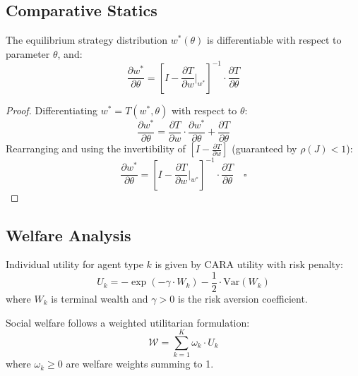 \subsection{Comparative Statics}

\begin{proposition}
\label{prop:comparative}
The equilibrium strategy distribution $w^*(\theta)$ is differentiable with respect to parameter $\theta$, and:
\begin{equation}
\frac{\partial w^*}{\partial \theta} = \left[I - \frac{\partial T}{\partial w}\bigg|_{w^*}\right]^{-1} \cdot \frac{\partial T}{\partial \theta}
\end{equation}
\end{proposition}

\begin{proof}
Differentiating $w^* = T(w^*, \theta)$ with respect to $\theta$:
\begin{equation}
\frac{\partial w^*}{\partial \theta} = \frac{\partial T}{\partial w} \cdot \frac{\partial w^*}{\partial \theta} + \frac{\partial T}{\partial \theta}
\end{equation}
Rearranging and using the invertibility of $[I - \frac{\partial T}{\partial w}]$ (guaranteed by $\rho(J) < 1$):
\begin{equation}
\frac{\partial w^*}{\partial \theta} = \left[I - \frac{\partial T}{\partial w}\bigg|_{w^*}\right]^{-1} \cdot \frac{\partial T}{\partial \theta} \quad \square
\end{equation}
\end{proof}

\subsection{Welfare Analysis}

Individual utility for agent type $k$ is given by CARA utility with risk penalty:
\begin{equation}
U_k = -\exp(-\gamma \cdot W_k) - \frac{1}{2} \cdot \text{Var}(W_k)
\end{equation}
where $W_k$ is terminal wealth and $\gamma > 0$ is the risk aversion coefficient.

Social welfare follows a weighted utilitarian formulation:
\begin{equation}
\mathcal{W} = \sum_{k=1}^K \omega_k \cdot U_k
\end{equation}
where $\omega_k \geq 0$ are welfare weights summing to 1.

